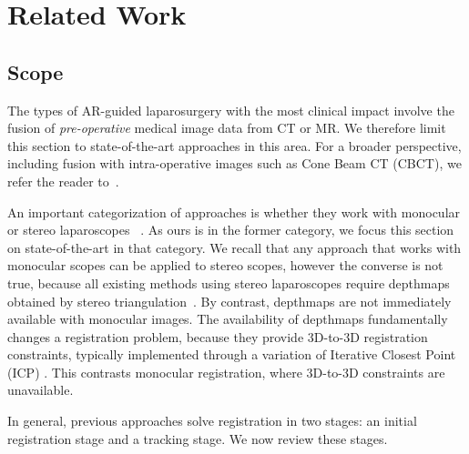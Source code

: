 
\section{Related Work}
\label{sec:sota}
\subsection{Scope}
The types of AR-guided laparosurgery with the most clinical impact involve the fusion of \emph{pre-operative} medical image data from CT or MR. We therefore limit this section to state-of-the-art approaches in this area. For a broader perspective, including fusion with intra-operative images such as Cone Beam CT (CBCT), we refer the reader to~\cite{Bernhardt2017}. 

An important categorization of approaches is whether they work with monocular~\cite{affineTracking} or stereo laparoscopes ~\cite{21142942,conf/miccai/Amir-KhaliliNPHA13,Cohen2010Prostate,hamarneh2014igrs,haouchine13,Su2009}. As ours is in the former category, we focus this section on state-of-the-art in that category. We recall that any approach that works with monocular scopes can be applied to stereo scopes, however the converse is not true, because all existing
methods using stereo laparoscopes require depthmaps obtained by stereo triangulation~\cite{DBLP:conf/miccai/StoyanovSPY10}. By contrast, depthmaps are not immediately available with monocular images. %
The availability of depthmaps fundamentally changes a registration problem, because they provide 3D-to-3D registration constraints, typically implemented through a variation of Iterative Closest Point (ICP) \TC{[XX]}. This contrasts monocular registration, where 3D-to-3D constraints are unavailable.%

In general, previous approaches solve registration in two stages: an initial registration stage and a tracking stage. We now review these stages.

